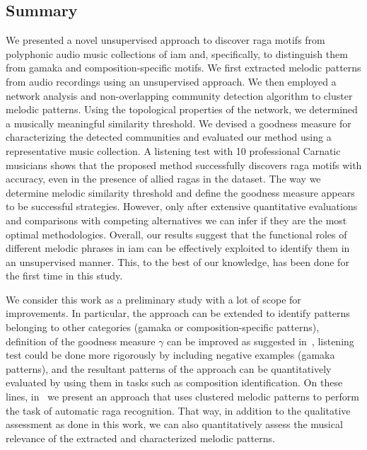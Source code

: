 \subsection{Summary}
\label{sec:patterns_characterization_summary}

We presented a novel unsupervised approach to discover \gls{raga} motifs from polyphonic audio music collections of \gls{iam} and, specifically, to distinguish them from gamaka and composition-specific motifs. We first extracted melodic patterns from audio recordings using an unsupervised approach. We then employed a network analysis and non-overlapping community detection algorithm to cluster melodic patterns. Using the topological properties of the network, we determined a musically meaningful similarity threshold. We devised a goodness measure for characterizing the detected communities and evaluated our method using a representative music collection. A listening test with 10 professional Carnatic musicians shows that the proposed method successfully discovers \gls{raga} motifs with accuracy, even in the presence of allied \glspl{raga} in the dataset. The way we determine melodic similarity threshold and define the goodness measure appears to be successful strategies. However, only after extensive quantitative evaluations and comparisons with competing alternatives we can infer if they are the most optimal methodologies. Overall, our results suggest that the functional roles of different melodic phrases in \gls{iam} can be effectively exploited to identify them in an unsupervised manner. This, to the best of our knowledge, has been done for the first time in this study. 


We consider this work as a preliminary study with a lot of scope for improvements. In particular, the approach can be extended to identify patterns belonging to other categories (\gls{gamaka} or composition-specific patterns), definition of the goodness measure $\gamma$ can be improved as suggested in~, listening test could be done more rigorously by including negative examples (\gls{gamaka} patterns), and the resultant patterns of the approach can be quantitatively evaluated by using them in tasks such as composition identification. On these lines, in~ we present an approach that uses clustered melodic patterns to perform the task of automatic \gls{raga} recognition. That way, in addition to the qualitative assessment as done in this work, we can also quantitatively assess the musical relevance of the extracted and characterized melodic patterns.


